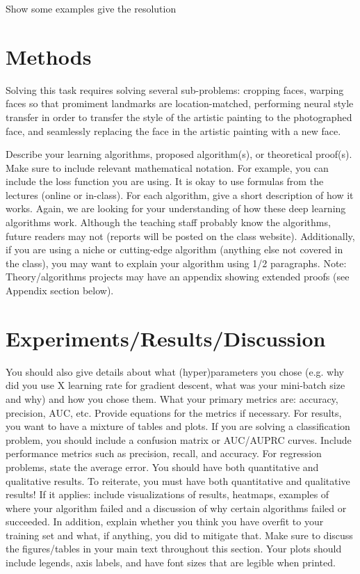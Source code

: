 \documentclass{article}
\begin{document}
Show some examples
give the resolution


\section{ Methods }

Solving this task requires solving several sub-problems: cropping faces, warping faces so that promiment landmarks are location-matched, performing neural style transfer in order to transfer the style of the artistic painting to the photographed face, and seamlessly replacing the face in the artistic painting with a new face. 

Describe your learning algorithms, proposed algorithm(s), or theoretical proof(s). Make
sure to include relevant mathematical notation. For example, you can include the loss function you are using. It is okay to use formulas from the lectures (online or in-class). For each algorithm, give a short description 
of how it works. Again, we are looking for your understanding of how these deep
learning algorithms work. Although the teaching staff probably know the algorithms, future
readers may not (reports will be posted on the class website). Additionally, if you are
using a niche or cutting-edge algorithm (anything else not covered in the class), you may want to explain your algorithm using 1/2
paragraphs. Note: Theory/algorithms projects may have an appendix showing extended
proofs (see Appendix section below).

\section{Experiments/Results/Discussion}

You should also give details about what (hyper)parameters you chose (e.g. why did you
use X learning rate for gradient descent, what was your mini-batch size and why) and how
you chose them. What your primary metrics are: accuracy, precision,
AUC, etc. Provide equations for the metrics if necessary. For results, you want to have a
mixture of tables and plots. If you are solving a classification problem, you should include a
confusion matrix or AUC/AUPRC curves. Include performance metrics such as precision,
recall, and accuracy. For regression problems, state the average error. You should have
both quantitative and qualitative results. To reiterate, you must have both quantitative
and qualitative results! If it applies: include visualizations of results, heatmaps,
examples of where your algorithm failed and a discussion of why certain algorithms failed
or succeeded. In addition, explain whether you think you have overfit to your training set
and what, if anything, you did to mitigate that. Make sure to discuss the figures/tables in
your main text throughout this section. Your plots should include legends, axis labels, and
have font sizes that are legible when printed.
\end{document}

